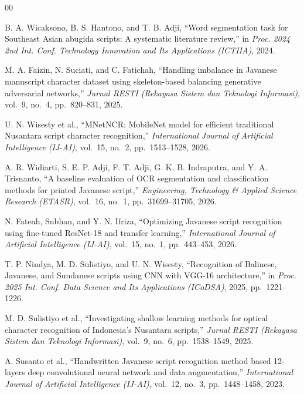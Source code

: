 \documentclass[conference]{IEEEtran}
\begin{document}
\begin{thebibliography}{00}

B. A. Wicaksono, B. S. Hantono, and T. B. Adji,
``Word segmentation task for Southeast Asian abugida scripts:
A systematic literature review,''
in \textit{Proc. 2024 2nd Int. Conf. Technology Innovation and
Its Applications (ICTIIA)}, 2024.

M. A. Faizin, N. Suciati, and C. Fatichah,
``Handling imbalance in Javanese manuscript character dataset
using skeleton-based balancing generative adversarial networks,''
\textit{Jurnal RESTI (Rekayasa Sistem dan Teknologi Informasi)},
vol.~9, no.~4, pp.~820--831, 2025.

U. N. Wisesty et al.,
``MNetNCR: MobileNet model for efficient traditional Nusantara
script character recognition,''
\textit{International Journal of Artificial Intelligence (IJ-AI)},
vol.~15, no.~2, pp.~1513--1528, 2026.

A. R. Widiarti, S. E. P. Adji, F. T. Adji, G. K. B. Indraputra,
and Y. A. Trisnanto,
``A baseline evaluation of OCR segmentation and classification
methods for printed Javanese script,''
\textit{Engineering, Technology \& Applied Science Research (ETASR)},
vol.~16, no.~1, pp.~31699--31705, 2026.

N. Fateah, Subhan, and Y. N. Ifriza,
``Optimizing Javanese script recognition using fine-tuned ResNet-18
and transfer learning,''
\textit{International Journal of Artificial Intelligence (IJ-AI)},
vol.~15, no.~1, pp.~443--453, 2026.

T. P. Nindya, M. D. Sulistiyo, and U. N. Wisesty,
``Recognition of Balinese, Javanese, and Sundanese scripts
using CNN with VGG-16 architecture,''
in \textit{Proc. 2025 Int. Conf. Data Science and Its Applications
(ICoDSA)}, 2025, pp.~1221--1226.

M. D. Sulistiyo et al.,
``Investigating shallow learning methods for optical character
recognition of Indonesia's Nusantara scripts,''
\textit{Jurnal RESTI (Rekayasa Sistem dan Teknologi Informasi)},
vol.~9, no.~6, pp.~1538--1549, 2025.

A. Susanto et al.,
``Handwritten Javanese script recognition method based 12-layers
deep convolutional neural network and data augmentation,''
\textit{International Journal of Artificial Intelligence (IJ-AI)},
vol.~12, no.~3, pp.~1448--1458, 2023.


\end{thebibliography}
\end{document}

